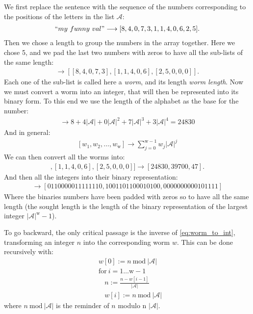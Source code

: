 \noindent
We first replace the sentence with the sequence of the numbers corresponding to the positions of the letters in the list $\mathcal{A}$:
\begin{align*}
   ``my~funny~val" \longrightarrow [8, 4, 0, 7, 3, 1, 1, 4, 0, 6, 2, 5].
\end{align*}
Then we chose a length to group the numbers in the array together. Here we chose 5, and we pad the last two numbers with zeros to have all the sub-lists of the same length:
\begin{align*}
   [8, 4, 0, 7, 3, 1, 1, 4, 0, 6, 2, 5] \longrightarrow [[8, 4, 0, 7, 3], [1, 1, 4, 0, 6], [2, 5, 0, 0, 0]].
\end{align*}
Each one of the sub-list is called here a \emph{worm}, and its length \emph{worm length}. Now we must convert a worm into an integer, that will then be represented into its binary form. To this end we use the length of the alphabet as the base for the number:
\begin{align*}
   [8, 4, 0, 7, 3]
   \longrightarrow
   8 + 4 \vert \mathcal{A}\vert + 0 \vert \mathcal{A}\vert^2 + 7\vert \mathcal{A}\vert^3 + 3\vert \mathcal{A}\vert^4 = 24830
\end{align*}
And in general:
\begin{align}\label{eq:worm_to_int}
   [w_1, w_2, \dots, w_{\text{w}}]
   \longrightarrow
   \sum_{j=0}^{\text{w} - 1} w_j \vert \mathcal{A}\vert^j
\end{align}
We can then convert all the worms into:
\begin{align*}
   [[8, 4, 0, 7, 3], [1, 1, 4, 0, 6], [2, 5, 0, 0, 0]]
   \longrightarrow
   [24830, 39700, 47].
\end{align*}
And then all the integers into their binary representation:
\begin{align*}
   [24830, 39700, 47] \longrightarrow [0110000011111110, 1001101100010100, 0000000000101111]
\end{align*}
Where the binaries numbers have been padded with zeros so to have all the same length (the sought length is the length of the binary representation of the largest integer $\vert \mathcal{A}\vert^{\text{w}} - 1$).

To go backward, the only critical passage is the inverse of \ref{eq:worm_to_int}, transforming an integer $n$ into the corresponding worm $w$. This can be done recursively with:
\begin{align*}
   &w[0] := n ~\text{mod}~ \vert\mathcal{A}\vert \\
   &\text{for}~i=1\dots \text{w}-1\\
   &~~~~ n := \frac{n - w[i-1]}{\vert\mathcal{A}\vert} \\
   &~~~~ w[i] := n ~\text{mod}~ \vert\mathcal{A}\vert
\end{align*}
where $n ~\text{mod}~ \vert\mathcal{A}\vert$ is the reminder of $n$ modulo n $\vert\mathcal{A}\vert$.

